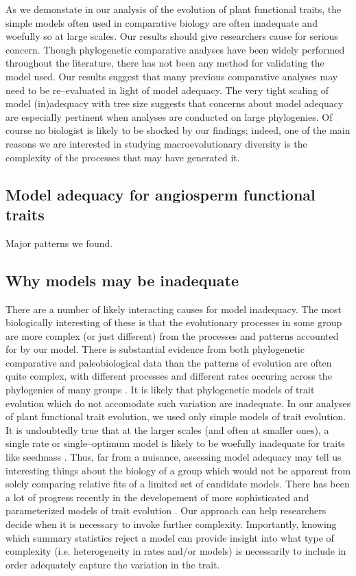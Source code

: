 \documentclass[a4paper,12pt]{article}
\begin{document}
As we demonstate in our analysis of the evolution of plant functional traits, the simple models often used in comparative biology are often inadequate and woefully so at large scales. Our results should give researchers cause for serious concern. Though phylogenetic comparative analyses have been widely performed throughout the literature, there has not been any method for validating the model used. Our results suggest that many previous comparative analyses may need to be re--evaluated in light of model adequacy. The very tight scaling of model (in)adequacy with tree size suggests that concerns about model adequacy are especially pertinent when analyses are conducted on large phylogenies. Of course no biologist is likely to be shocked by our findings; indeed, one of the main reasons we are interested in studying macroevolutionary diversity is the complexity of the processes that may have generated it.  

\subsection{Model adequacy for angiosperm functional traits}
Major patterns we found.

\subsection*{Why models may be inadequate}
There are a number of likely interacting causes for model inadequacy. The most biologically interesting of these is that the evolutionary processes in some group are more complex (or just different) from the processes and patterns accounted for by our model.  There is substantial evidence from both phylogenetic comparative and paleobiological data than the patterns of evolution are often quite complex, with different processes and different rates occuring across the phylogenies of many groups \citep{Foote1997, Grey2008, Hunt2012, Hopkins2012, PennellPE}. It is likely that phylogenetic models of trait evolution which do not accomodate such variation are inadequate. In our analyses of plant functional trait evolution, we used only simple models of trait evolution. It is undoubtedly true that at the larger scales (and often at smaller ones), a single rate or single--optimum model is likely to be woefully inadequate for traits like seedmass \citep{Moles2005}. Thus, far from a nuisance, assessing model adequacy may tell us interesting things about the biology of a group which would not be apparent from solely comparing relative fits of a limited set of candidate models. There has been a lot of progress recently in the developement of more sophisticated and parameterized models of trait evolution \citep{ButlerKing2004, Omeara2006, FitzJohn2010, Eastman2011, Venditti2011, Revell2012, Beaulieu2012}. Our approach can help researchers decide when it is necessary to invoke further complexity. Importantly, knowing which summary statistics reject a model can provide insight into what type of complexity (i.e. heterogeneity in rates and/or models) is necessarily to include in order adequately capture the variation in the trait.
\end{document}
